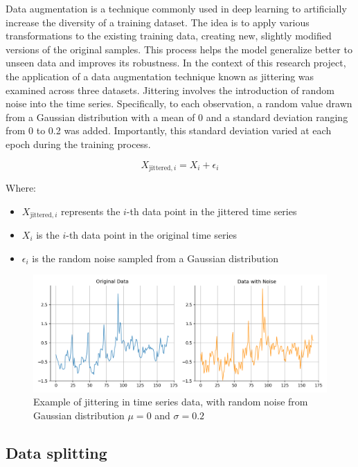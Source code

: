 Data augmentation is a technique commonly used in deep learning to artificially increase the diversity of a training dataset. The idea is to apply various transformations to the existing training data, creating new, slightly modified versions of the original samples. This process helps the model generalize better to unseen data and improves its robustness.
In the context of this research project, the application of a data augmentation technique known as jittering was examined across three datasets. Jittering involves the introduction of random noise into the time series. Specifically, to each observation, a random value drawn from a Gaussian distribution with a mean of 0 and a standard deviation ranging from 0 to 0.2 was added. Importantly, this standard deviation varied at each epoch during the training process.

\begin{figure}
\[X_{\text{jittered}, i} = X_i + \epsilon_i\]
\label{eq:jittering}
\end{figure}
Where: 
\begin{itemize}[noitemsep, leftmargin=*]
    \item[] $X_{\text{jittered}, i}$ represents the \(i\)-th data point in the jittered time series
    \item[] \(X_i\) is the \(i\)-th data point in the original time series
    \item[] \(\epsilon_i\) is the random noise sampled from a Gaussian distribution
\end{itemize}

\begin{figure}
    \centering
    \includegraphics[width=0.75\linewidth]{images/jittering.png}
    \caption{Example of jittering in time series data, with random noise from Gaussian distribution $\mu = 0$ and $\sigma = 0.2$}
    \label{fig:jittering}
\end{figure}


\subsection{Data splitting}

